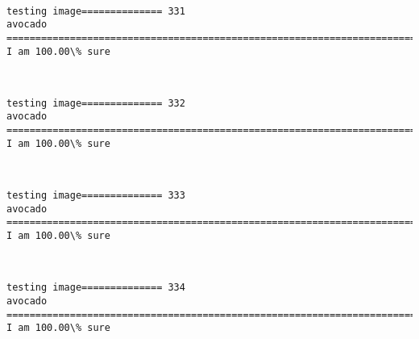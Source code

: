 \documentclass[11pt]{article}
\begin{document}
    \begin{center}
    \end{center}
    { \hspace*{\fill} \\}
    
    \begin{Verbatim}[commandchars=\\\{\}]
testing image============== 331
avocado
============================================================================
I am 100.00\% sure

    \end{Verbatim}

    \begin{center}
    \end{center}
    { \hspace*{\fill} \\}
    
    \begin{Verbatim}[commandchars=\\\{\}]
testing image============== 332
avocado
============================================================================
I am 100.00\% sure

    \end{Verbatim}

    \begin{center}
    \end{center}
    { \hspace*{\fill} \\}
    
    \begin{Verbatim}[commandchars=\\\{\}]
testing image============== 333
avocado
============================================================================
I am 100.00\% sure

    \end{Verbatim}

    \begin{center}
    \end{center}
    { \hspace*{\fill} \\}
    
    \begin{Verbatim}[commandchars=\\\{\}]
testing image============== 334
avocado
============================================================================
I am 100.00\% sure

    \end{Verbatim}
\end{document}
